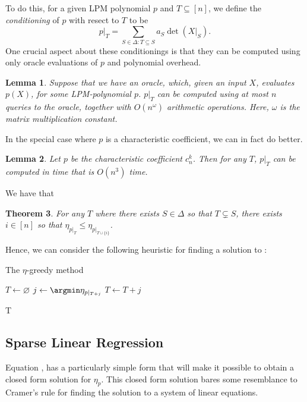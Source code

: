 \documentclass{amsart}
\newtheorem{theorem}{Theorem}[section]
\newtheorem{lemma}[theorem]{Lemma}
\theoremstyle{definition}
\begin{document}
To do this, for a given LPM polynomial $p$ and $T \subseteq [n]$, we define the \emph{conditioning} of $p$ with resect to $T$ to be 
\[
    p|_T = \sum_{S \in \Delta : T \subseteq S} a_S \det(X|_S).
\]
One crucial aspect about these conditionings is that they can be computed using only oracle evaluations of $p$ and polynomial overhead.
\begin{lemma}
    Suppose that we have an oracle, which, given an input $X$, evaluates $p(X)$, for some LPM-polynomial $p$.
    $p|_T$ can be computed using at most $n$ queries to the oracle, together with $O(n^{\omega})$ arithmetic operations.
    Here, $\omega$ is the matrix multiplication constant.
\end{lemma}

In the special case where $p$ is a characteristic coefficient, we can in fact do better.
\begin{lemma}
    Let $p$ be the characteristic coefficient $c^k_n$. Then for any $T$, $p|_T$ can be computed in time that is $O(n^3)$ time.
\end{lemma}

We have that 
\begin{theorem}
    For any $T$ where there exists $S \in \Delta$ so that $T \subsetneq S$, there exists $i \in [n]$ so that $\eta_{p|_T} \le \eta_{p|_{T\cup\{i\}}}$.
\end{theorem}
Hence, we can consider the following heuristic for finding a solution to :
%
\begin{algorithm}
    \caption{The $\eta$-greedy method}
    \begin{algorithmic}\label{alg:greedy}
        \State $T \gets \varnothing$
            \State $j \gets \argmin \eta_{p|_{T + j}}$
            \State $T \gets T + j$
        \EndFor

        \Return T
    \end{algorithmic}
\end{algorithm}

\subsection{Sparse Linear Regression}
Equation , has a particularly simple form that will make it possible to obtain a closed form solution for $\eta_p$. This closed form solution bares some resemblance to Cramer's rule for finding the solution to a system of linear equations.
\end{document}
